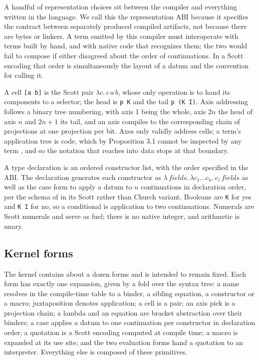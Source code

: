 \documentclass[english,submission,code=tt]{programming}
\begin{document}
A handful of representation choices sit between the compiler and
everything written in the language.  We call this the representation 
ABI because it specifies the contract between separately produced 
compiled artifacts, not because there are bytes or linkers.  A term 
emitted by this compiler must interoperate with terms built by hand, 
and with native code that recognizes them; the two would fail to 
compose if either disagreed about the order of continuations.  In a 
Scott encoding that order is simultaneously the layout of a datum and 
the convention for calling it.

A cell \texttt{[a b]} is the Scott 
pair $\lambda c.\,c\,a\,b$, whose only operation is to hand its 
components to a selector; the head is \texttt{p K} and the tail
\texttt{p (K I)}.  Axis addressing follows a binary tree numbering, 
with axis 1 being the whole, axis $2n$ the head of axis $n$ and $2n+1$ 
its tail, and an axis compiles to the corresponding chain of 
projections at one projection per bit.  Axes only validly address
cells; a term's application tree is code, which by Proposition 3.1
cannot be inspected by any term \citep[Thm.~3.2]{JayGivenWilson2011}, and so the notation that reaches into 
data stops at that boundary.

A type declaration is an ordered constructor list, with the order 
specified in the ABI.  The declaration generates each constructor as 
$\lambda \,\mathit{fields}.\,\lambda c_1\ldots c_n.\,c_i\,\mathit{fields}$
as well as the case form to apply a datum to $n$ continuations in 
declaration order, per the schema of \citet{BohmBerarducci1985} in its 
Scott rather than Church variant. Booleans are \texttt{K} for yes and 
\texttt{K I} for no, so a conditional is application to two 
continuations.  Numerals are Scott numerals and serve as fuel; there is 
no native integer, and arithmetic is unary.

\subsection{Kernel forms}\label{sec:kernel-forms}

The kernel contains about a dozen forms and is intended to remain fixed.
Each form has exactly one expansion, given by a fold over the
syntax tree: a name resolves in the compile-time table to a binder, a
sibling equation, a constructor or a macro; juxtaposition denotes 
application; a cell is a pair; an axis pick is a projection chain; a 
lambda and an equation are bracket abstraction over their binders; a 
case applies a datum to one continuation per constructor in declaration 
order; a quotation is a Scott encoding computed at compile time; a 
macro is expanded at its use site; and the two evaluation forms hand a 
quotation to an interpreter.  Everything else is composed of these 
primitives.
\end{document}
